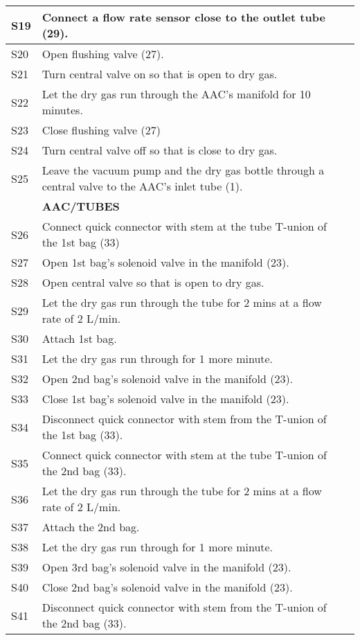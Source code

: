 \begin{longtable} {|m{}|m{}|m{}|}
S19 & Connect a flow rate sensor close to the outlet tube (29). & \\ \hline
S20 & Open flushing valve (27). & \\ \hline
S21 & Turn central valve on so that is open to dry gas. & \\ \hline
S22 & Let the dry gas run through the AAC's manifold for 10 minutes. & \\ \hline
S23 & Close flushing valve (27) & \\ \hline
S24 & Turn central valve off so that is close to dry gas. & \\ \hline
S25 & Leave the vacuum pump and the dry gas bottle through a central valve to the AAC's inlet tube (1). & \\ \hline
& \textbf{AAC/TUBES} & \\ \hline
S26 & Connect quick connector with stem at the tube T-union of the 1st bag (33) & \\ \hline
S27 & Open 1st bag's solenoid valve in the manifold (23). & \\ \hline
S28 & Open central valve so that is open to dry gas. & \\ \hline
S29 & Let the dry gas run through the tube for 2 mins at a flow rate of 2 L/min. & \\ \hline
S30 & Attach 1st bag. & \\ \hline
S31 & Let the dry gas run through for 1 more minute. & \\ \hline
S32 & Open 2nd bag's solenoid valve in the manifold (23). & \\ \hline
S33 & Close 1st bag's solenoid valve in the manifold (23). & \\ \hline
S34 & Disconnect quick connector with stem from the T-union of the 1st bag (33). & \\ \hline
S35 & Connect quick connector with stem at the tube T-union of the 2nd bag (33). & \\ \hline
S36 & Let the dry gas run through the tube for 2 mins at a flow rate of 2 L/min. & \\ \hline
S37 & Attach the 2nd bag. & \\ \hline
S38 & Let the dry gas run through for 1 more minute. & \\ \hline
S39 & Open 3rd bag's solenoid valve in the manifold (23). & \\ \hline
S40 & Close 2nd bag's solenoid valve in the manifold (23). & \\ \hline
S41 & Disconnect quick connector with stem from the T-union of the 2nd bag (33). & \\ \hline

\end{longtable}
